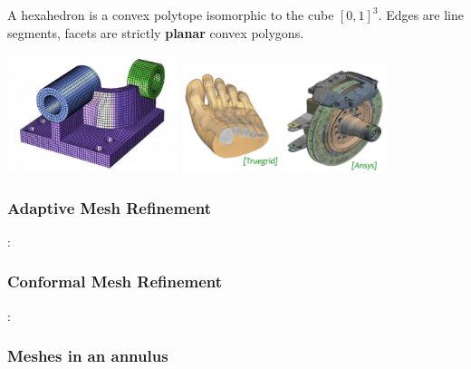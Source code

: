 A hexahedron is a convex polytope isomorphic to the cube $[0,1]^3$.
Edges are line segments, facets are strictly {\bf planar} convex polygons.

\begin{center}
\includegraphics[width=5cm]{images/meshes/hexa.jpg}
\includegraphics[width=6cm]{images/meshes/hexa2}
\end{center}




\subsubsection{Adaptive Mesh Refinement}
 

\Literature: \cite{bugg10}\cite{beck10}\cite{lezh11} \cite[sect 3]{bugs09} \cite{beck10}





\subsubsection{Conformal Mesh Refinement}

\Literature: \cite{vaks15}\cite{kott05}


\subsubsection{Meshes in an annulus}


